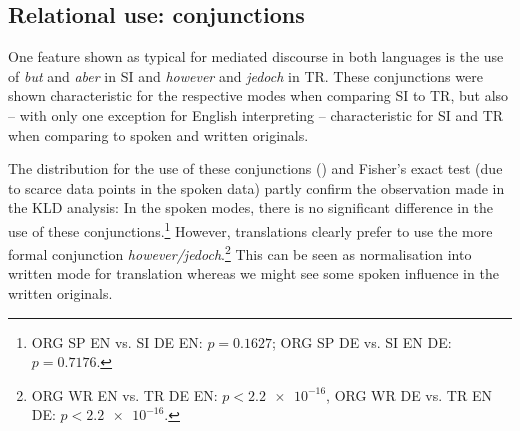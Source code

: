 \documentclass[output=paper,colorlinks,citecolor=brown]{langscibook}
\begin{document}
\subsection{Relational use: conjunctions}
One feature shown as typical for mediated discourse in both languages is the use of \textit{but} and \textit{aber} in SI and \textit{however} and \textit{jedoch} in TR. These conjunctions were shown characteristic for the respective modes when comparing SI to TR, but also -- with only one exception for English interpreting -- characteristic for SI and TR when comparing to spoken and written originals.

The distribution for the use of these conjunctions () and Fisher's exact test (due to scarce data points in the spoken data) partly confirm the observation made in the KLD analysis: In the spoken modes, there is no significant difference in the use of these conjunctions.\footnote{ORG SP EN vs. SI DE EN: $p = 0.1627$; ORG SP DE vs. SI EN DE: $p = 0.7176$.} However, translations clearly prefer to use the more formal conjunction \textit{however/jedoch}.\footnote{ORG WR EN vs. TR DE EN: $p< \num{2.2e-16}$, ORG WR DE vs. TR EN DE: $p < \num{2.2e-16}$.} This can be seen as normalisation into written mode for translation whereas we might see some spoken influence in the written originals.
\end{document}
